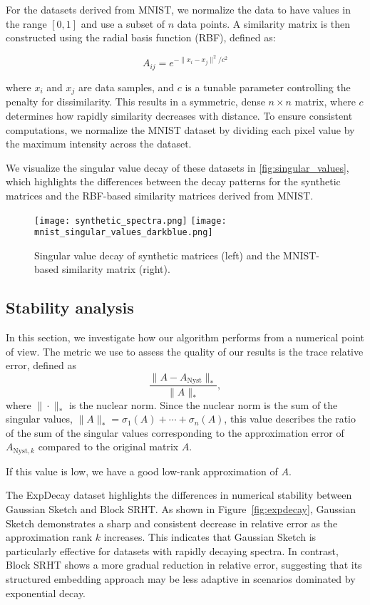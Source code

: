 \documentclass[a4paper, 12pt,oneside]{article}
\begin{document}
For the datasets derived from MNIST, we normalize the data to have values in the range \([0, 1]\) and use a subset of \( n \) data points. A similarity matrix is then constructed using the radial basis function (RBF), defined as:

\[
A_{ij} = e^{-\|x_i - x_j\|^2 / c^2}
\]

where \( x_i \) and \( x_j \) are data samples, and \( c \) is a tunable parameter controlling the penalty for dissimilarity. This results in a symmetric, dense \( n \times n \) matrix, where \( c \) determines how rapidly similarity decreases with distance. To ensure consistent computations, we normalize the MNIST dataset by dividing each pixel value by the maximum intensity across the dataset.

We visualize the singular value decay of these datasets in \cref{fig:singular_values}, which highlights the differences between the decay patterns for the synthetic matrices and the RBF-based similarity matrices derived from MNIST.
\begin{figure}[H]
    \centering
    \texttt{[image: synthetic\_spectra.png]}
    \hspace{0.02\textwidth} %
    \texttt{[image: mnist\_singular\_values\_darkblue.png]}
    \caption{Singular value decay of synthetic matrices (left) and the MNIST-based similarity matrix (right).}
    \label{fig:singular_value_comparison}
\end{figure}
		\subsection{Stability analysis}
		
		In this section, we investigate how our algorithm performs from a numerical point of view. The metric we use to assess the quality of our results is the trace relative error, defined as
\[
\frac{\|A - A_{\text{Nyst}}\|_*}{\|A\|_*},
\]
where \(\|\cdot\|_*\) is the nuclear norm. Since the nuclear norm is the sum of the singular values, \(\|A\|_* = \sigma_1(A) + \cdots + \sigma_n(A)\), this value describes the ratio of the sum of the singular values corresponding to the approximation error of \(A_{\text{Nyst}, k}\) compared to the original matrix \(A\).

If this value is low, we have a good low-rank approximation of \(A\).

The ExpDecay dataset highlights the differences in numerical stability between Gaussian Sketch and Block SRHT. As shown in Figure~\ref{fig:expdecay}, Gaussian Sketch demonstrates a sharp and consistent decrease in relative error as the approximation rank \(k\) increases. This indicates that Gaussian Sketch is particularly effective for datasets with rapidly decaying spectra. In contrast, Block SRHT shows a more gradual reduction in relative error, suggesting that its structured embedding approach may be less adaptive in scenarios dominated by exponential decay.
\end{document}
